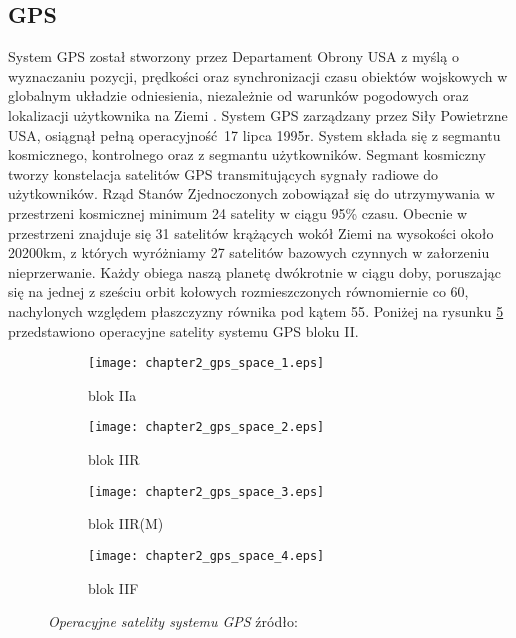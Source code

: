 	\subsection{GPS}
\noindent System GPS został stworzony przez Departament Obrony USA z myślą o wyznaczaniu pozycji, prędkości oraz synchronizacji czasu obiektów wojskowych
w globalnym układzie odniesienia, niezależnie od warunków pogodowych oraz lokalizacji użytkownika na Ziemi \cite[][strona 309]{hofmann_gnss}.
System GPS zarządzany przez Siły Powietrzne USA, osiągnął pełną operacyjność 17 lipca 1995r. System składa się z segmantu kosmicznego, kontrolnego oraz z segmantu użytkowników.
Segmant kosmiczny tworzy konstelacja satelitów GPS transmitujących sygnały radiowe do użytkowników. Rząd Stanów Zjednoczonych zobowiązał się do 
utrzymywania w przestrzeni kosmicznej minimum 24 satelity w ciągu 95\% czasu. Obecnie w przestrzeni znajduje się 31 satelitów krążących wokół Ziemi na 
wysokości około 20200km, z których wyróżniamy 27 satelitów bazowych czynnych w załorzeniu nieprzerwanie. 
Każdy obiega naszą planetę dwókrotnie w ciągu doby, poruszając się na jednej z sześciu orbit kołowych rozmieszczonych równomiernie co 60\degree,
nachylonych względem płaszczyzny równika pod kątem 55\degree \cite[]{GPS_GOV}. Poniżej na rysunku \ref{fig:gps_space_segment} przedstawiono operacyjne satelity systemu GPS
bloku II.
\begin{figure}[H]
\centering
\begin{subfigure}{.2\textwidth}
  \centering
  \texttt{[image: chapter2\_gps\_space\_1.eps]}
  \caption{blok IIa}
  \label{fig:block2a}
\end{subfigure}%
\begin{subfigure}{.2\textwidth}
  \centering
  \texttt{[image: chapter2\_gps\_space\_2.eps]}
  \caption{blok IIR}
  \label{fig:block2r}
\end{subfigure}
\begin{subfigure}{.2\textwidth}
        \centering
        \texttt{[image: chapter2\_gps\_space\_3.eps]}
        \caption{blok IIR(M)}
        \label{fig:block2rm}
\end{subfigure}
\begin{subfigure}{.2\textwidth}
        \centering
        \texttt{[image: chapter2\_gps\_space\_4.eps]}
        \caption{blok IIF}
        \label{fig:block2f}
\end{subfigure}
\caption{\textit{Operacyjne satelity systemu GPS}
źródło: \cite[]{GPS_GOV}}
\label{fig:gps_space_segment}
\end{figure}
